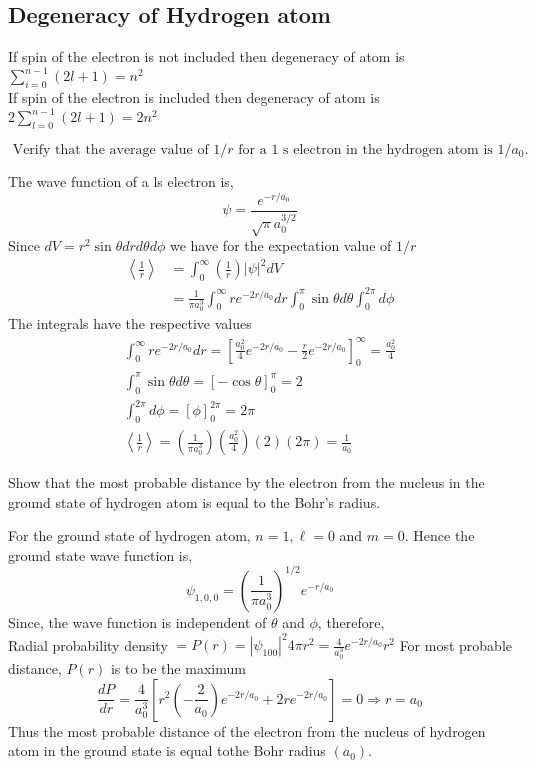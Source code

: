 \subsection{ Degeneracy of Hydrogen atom}
If spin of the electron is not included then degeneracy of atom is $\sum_{i=0}^{n-1}(2 l+1)=n^{2}$\\
If spin of the electron is included then degeneracy of atom is $2 \sum_{l=0}^{n-1}(2 l+1)=2 n^{2}$

\begin{exercise}
	$\text { Verify that the average value of } 1 / r \text { for a } 1 \text { s electron in the hydrogen atom is } 1 / a_{0} \text {. }$
\end{exercise}
\begin{answer}
The wave function of a ls electron is,
$$
\psi=\frac{e^{-r / a_{0}}}{\sqrt{\pi} a_{0}^{3 / 2}}
$$
Since $d V=r^{2} \sin \theta d r d \theta d \phi$ we have for the expectation value of $1 / r$
$$
\begin{aligned}
\left\langle\frac{1}{r}\right\rangle &=\int_{0}^{\infty}\left(\frac{1}{r}\right)|\psi|^{2} d V \\
&=\frac{1}{\pi a_{0}^{3}} \int_{0}^{\infty} r e^{-2 r / a_{0}} d r \int_{0}^{\pi} \sin \theta d \theta \int_{0}^{2 \pi} d \phi
\end{aligned}
$$
The integrals have the respective values
$$
\begin{gathered}
\int_{0}^{\infty} r e^{-2 r / a_{0}} d r=\left[\frac{a_{0}^{2}}{4} e^{-2 r / a_{0}}-\frac{r}{2} e^{-2 r / a_{0}}\right]_{0}^{\infty}=\frac{a_{0}^{2}}{4} \\
\int_{0}^{\pi} \sin \theta d \theta=[-\cos \theta]_{0}^{\pi}=2 \\
\int_{0}^{2 \pi} d \phi=[\phi]_{0}^{2 \pi}=2 \pi \\
\left\langle\frac{1}{r}\right\rangle=\left(\frac{1}{\pi a_{0}^{3}}\right)\left(\frac{a_{0}^{2}}{4}\right)(2)(2 \pi)=\frac{1}{a_{0}}
\end{gathered}
$$	
\end{answer}
\begin{exercise}
 Show that the most probable distance by the electron from the nucleus in the ground state of hydrogen atom is equal to the Bohr's radius.
\end{exercise}
\begin{answer}
For the ground state of hydrogen atom, $n=1, \ell=0$ and $m=0$. Hence the ground state wave function is,
$$
\psi_{1,0,0}=\left(\frac{1}{\pi a_{0}^{3}}\right)^{1 / 2} e^{-r / a_{0}}
$$
Since, the wave function is independent of $\theta$ and $\phi$, therefore,\\
Radial probability density $=P(r)=\left|\psi_{100}\right|^{2} 4 \pi r^{2}=\frac{4}{a_{0}^{3}} e^{-2 r / a_{0}} r^{2}$
For most probable distance, $P(r)$ is to be the maximum
$$
\frac{d P}{d r}=\frac{4}{a_{0}^{3}}\left[r^{2}\left(-\frac{2}{a_{0}}\right) e^{-2 r / a_{0}}+2 r e^{-2 r / a_{0}}\right]=0 \Rightarrow r=a_{0}
$$
Thus the most probable distance of the electron from the nucleus of hydrogen atom in the ground state is equal tothe Bohr radius $\left(a_{0}\right)$.	
\end{answer}
